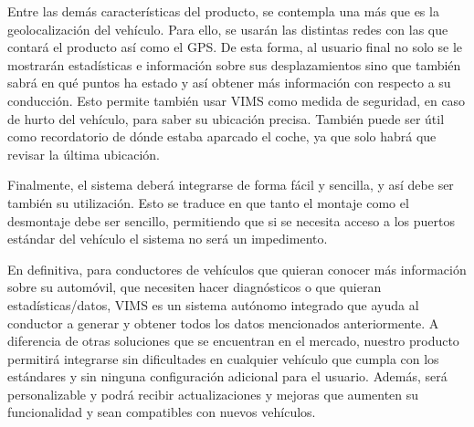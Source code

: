 Entre las demás características del producto, se contempla una más que es la
geolocalización del vehículo. Para ello, se usarán las distintas redes con
las que contará el producto así como el \ac{GPS}. De esta forma,
al usuario final no solo se le mostrarán estadísticas e información sobre sus
desplazamientos sino que también sabrá en qué puntos ha estado y así obtener más
información con respecto a su conducción. Esto permite también usar \ac{VIMS} como
medida de seguridad, en caso de hurto del vehículo, para saber su ubicación
precisa. También puede ser útil como recordatorio de dónde estaba aparcado el
coche, ya que solo habrá que revisar la última ubicación.

Finalmente, el sistema deberá integrarse de forma fácil y sencilla, y así debe ser
también su utilización. Esto se traduce en que tanto el
montaje como el desmontaje debe ser sencillo, permitiendo que si se necesita acceso
a los puertos estándar del vehículo el sistema no será un impedimento.

En definitiva, para conductores de vehículos que quieran conocer
más información sobre su automóvil, que necesiten hacer diagnósticos o que quieran
estadísticas/datos, \ac{VIMS} es un sistema autónomo integrado
que ayuda al conductor a generar y obtener todos los datos mencionados anteriormente. 
A diferencia de otras soluciones que se encuentran
en el mercado, nuestro producto permitirá integrarse sin dificultades en cualquier
vehículo que cumpla con los estándares y sin ninguna configuración adicional para
el usuario. Además, será personalizable y podrá recibir actualizaciones
y mejoras que aumenten su funcionalidad y sean compatibles con nuevos vehículos.